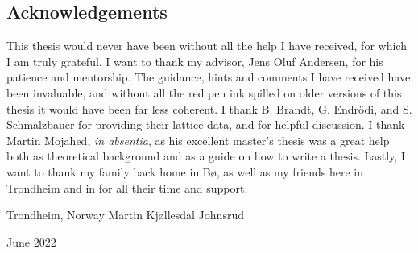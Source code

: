 \subsection*{Acknowledgements}


This thesis would never have been without all the help I have received, for which I am truly grateful.
I want to thank my advisor, Jens Oluf Andersen, for his patience and mentorship.
The guidance, hints and comments I have received have been invaluable, and without all the red pen ink spilled on older versions of this thesis it would have been far less coherent.
I thank B. Brandt, G. Endr\H{o}di, and S. Schmalzbauer for providing their lattice data, and for helpful discussion.
I thank Martin Mojahed, \emph{in absentia}, as his excellent master's thesis was a great help both as theoretical background and as a guide on how to write a thesis.
Lastly, I want to thank my family back home in Bø, as well as my friends here in Trondheim and in for all their time and support.


\vspace{1.4cm}

{
    \noindent
    Trondheim, Norway \hfill Martin Kjøllesdal Johnsrud

    \noindent
    June 2022
}